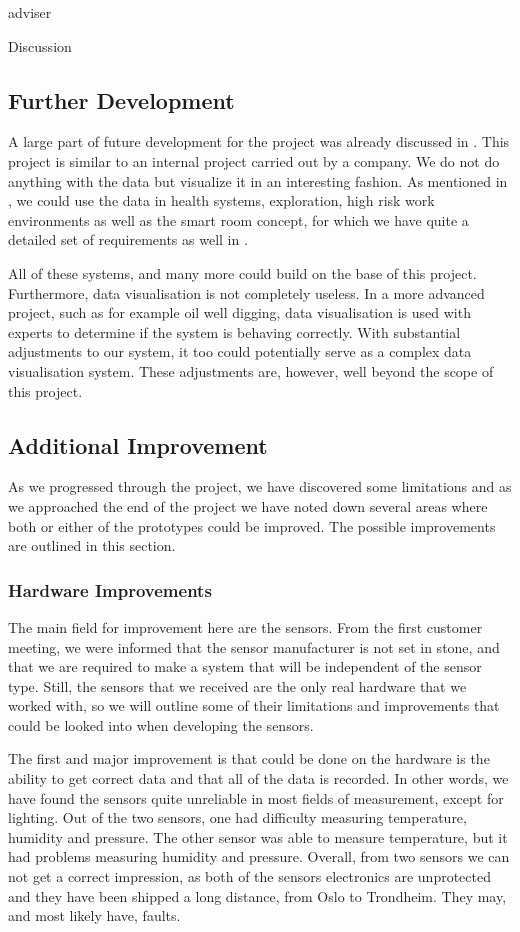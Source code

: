 adviser\documentclass[../document]{subfiles}
\begin{document}
Discussion

\subsection{Further Development}
A large part of future development for the project was already discussed in . This project is similar to an internal project carried out by a company. We do not do anything with the data but visualize it in an interesting fashion. As mentioned in , we could use the data in health systems, exploration, high risk work environments as well as the smart room concept, for which we have quite a detailed set of requirements as well in . 

All of these systems, and many more could build on the base of this project. Furthermore, data visualisation is not completely useless. In a more advanced project, such as for example oil well digging, data visualisation is used with experts to determine if the system is behaving correctly. With substantial adjustments to our system, it too could potentially serve as a complex data visualisation system. These adjustments are, however, well beyond the scope of this project.

\subsection{Additional Improvement}
As we progressed through the project, we have discovered some limitations and as we approached the end of the project we have noted down several areas where both or either of the prototypes could be improved. The possible improvements are outlined in this section.

\subsubsection{Hardware Improvements}
The main field for improvement here are the sensors. From the first customer meeting, we were informed that the sensor manufacturer is not set in stone, and that we are required to make a system that will be independent of the sensor type. Still, the sensors that we received are the only real hardware that we worked with, so we will outline some of their limitations and improvements that could be looked into when developing the sensors. 

The first and major improvement is that could be done on the hardware is the ability to get correct data and that all of the data is recorded. In other words, we have found the sensors quite unreliable in most fields of measurement, except for lighting. Out of the two sensors, one had difficulty measuring temperature, humidity and pressure. The other sensor was able to measure temperature, but it had problems measuring humidity and pressure. Overall, from two sensors we can not get a correct impression, as both of the sensors electronics are unprotected and they have been shipped a long distance, from Oslo to Trondheim. They may, and most likely have, faults.
\end{document}
